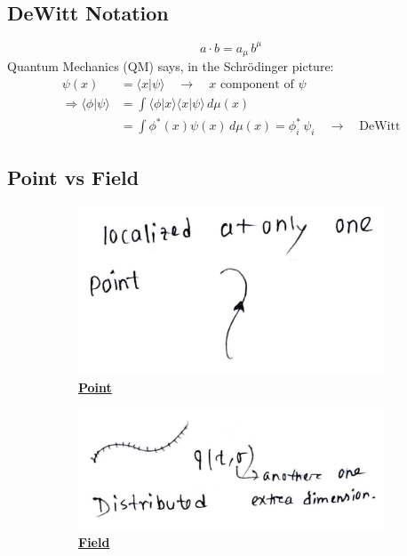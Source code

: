 \documentclass[14pt]{article} %
\begin{document}
\subsection{DeWitt Notation}
\[ a \cdot b = a_\mu\, b^\mu \]
Quantum Mechanics (QM) says, in the Schrödinger picture:
\begin{align*}
\psi(x) &= \langle x | \psi \rangle \quad \to \quad x\text{ component of } \psi \\
\Rightarrow \langle \phi | \psi \rangle &= \int \langle \phi | x \rangle \langle x | \psi \rangle \, d\mu(x) \\
&= \int \phi^*(x) \psi(x) \, d\mu(x) = \phi_i^* \,\psi_i \quad \to \quad \text{DeWitt}
\end{align*}
\subsection{Point vs Field}
\begin{figure}[H]
    \centering
    
    \begin{subfigure}[t]{0.3\textwidth}
        \centering
        \includegraphics[width=\textwidth]{figures/L5_1.jpeg}
        \caption*{\underline{\textbf{Point}}\\[1ex]}
    \end{subfigure}
    \hfill
    \begin{subfigure}[t]{0.4\textwidth}
        \centering
        \includegraphics[width=\textwidth]{figures/L5_2.jpeg}
        \caption*{\underline{\textbf{Field}}\\[1ex]}
    \end{subfigure}    
    \caption*{}
\end{figure}
\end{document}
